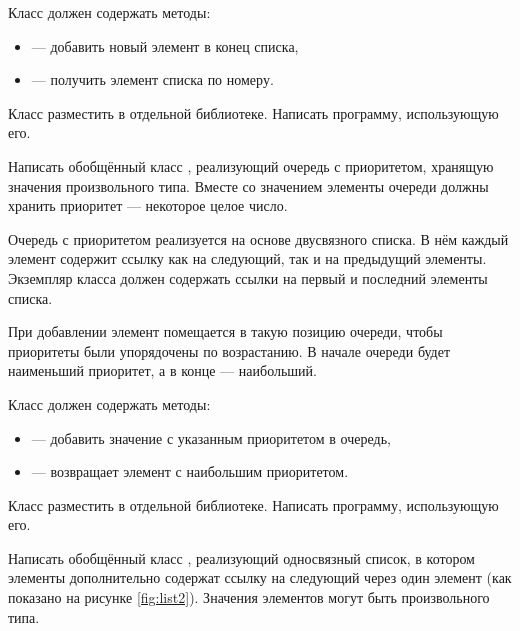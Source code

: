 Класс должен содержать методы:
\begin{itemize}
\item {} — добавить новый элемент в конец списка,
\item {} — получить элемент списка по номеру.
\end{itemize}

Класс разместить в отдельной библиотеке. Написать программу,
использующую его.

\task Написать обобщённый класс , реализующий
очередь с приоритетом, хранящую значения произвольного типа. Вместе со
значением элементы очереди должны хранить приоритет — некоторое целое
число.

Очередь с приоритетом реализуется на основе двусвязного списка. В нём
каждый элемент содержит ссылку как на следующий, так и на предыдущий
элементы. Экземпляр класса должен содержать ссылки на первый и
последний элементы списка.

При добавлении элемент помещается в такую позицию очереди, чтобы
приоритеты были упорядочены по возрастанию. В начале очереди будет
наименьший приоритет, а в конце — наибольший.

Класс должен содержать методы:
\begin{itemize}
\item {} — добавить значение с указанным приоритетом в очередь,
\item {} — возвращает элемент с наибольшим приоритетом.
\end{itemize}

Класс разместить в отдельной библиотеке. Написать программу,
использующую его.

\task Написать обобщённый класс , реализующий
односвязный список, в котором элементы дополнительно содержат ссылку
на следующий через один элемент (как показано на рисунке
\ref{fig:list2}).  Значения элементов могут быть произвольного типа.

